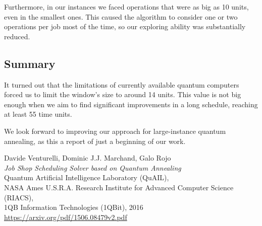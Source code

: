 \documentclass[letterpaper, 11pt]{article}
\begin{document}
\begin{multicols}{2}
Furthermore, in our instances we faced operations that were as
big as 10 units, even in the smallest ones. This caused the 
algorithm to consider one or two operations per job most of 
the time, so our exploring ability was substantially reduced.

\subsection{Summary}
It turned out that the limitations of currently available quantum 
computers forced us to limit the window's size to around 14 units.
This value is not big enough when we aim to find significant 
improvements in a long schedule, reaching at least 55 time units.

We look forward to improving our approach for large-instance
quantum annealing, as this a report of just a beginning of
our work.



\end{multicols}
\newpage
\begin{thebibliography}{9}

    Davide Venturelli, Dominic J.J. Marchand, Galo Rojo \\
    \textit{Job Shop Scheduling Solver based on Quantum Annealing} \\
    Quantum Artificial Intelligence Laboratory (QuAIL), \\ NASA Ames
    U.S.R.A. Research Institute for Advanced Computer Science (RIACS), \\
    1QB Information Technologies (1QBit),  2016\\
    \url{https://arxiv.org/pdf/1506.08479v2.pdf}

\end{thebibliography}
\end{document}
